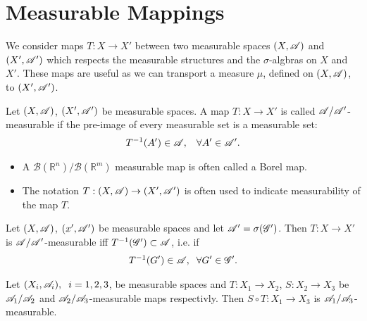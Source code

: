 \section{Measurable Mappings}

    We consider maps $T:X\rightarrow X'$ between two measurable spaces $(X,\mathscr{A})$ and $(X',\mathscr{A}')$ which respects the measurable 
    structures and the $\sigma$-algbras on $X$ and $X'$. These maps are useful as we can transport a measure $\mu$, defined on $(X,\mathscr{A})$, to $(X',\mathscr{A}')$.

    

    \begin{definition}
        Let $(X,\mathscr{A})$, $(X',\mathscr{A}')$ be measurable spaces. A map $T:X\rightarrow X'$ is called $\mathscr{A}/\mathscr{A}'$-measurable if the pre-image of every measurable set is a measurable set: 
        \begin{align}
        T^{-1}(A')\in \mathscr{A},\hspace{3mm} \forall A'\in\mathscr{A}'.    
        \end{align}

    \end{definition}
    \begin{itemize}
        \item A $\mathcal B(\mathbb R^n)/\mathcal B(\mathbb R^m)$ measurable map is often called a Borel map. 
        \item The notation $T:(X,\mathscr{A})\rightarrow (X',\mathscr{A}')$ is often used to indicate measurability of the map $T$.
    \end{itemize}

    \begin{lemma}
        Let $(X,\mathscr{A})$, $(x',\mathscr{A}')$ be measurable spaces and let $\mathscr{A}' = \sigma(\mathscr{G}')$. Then $T:X\rightarrow X'$ is $\mathscr{A}/\mathscr{A}'$-measurable iff $T^{-1}(\mathscr{G}')\subset \mathscr{A}$, i.e. if 
        \begin{align}
            T^{-1}(G')\in\mathscr{A},\hspace{2mm} \forall G'\in\mathscr{G}'.
        \end{align} 
    \end{lemma}


	\begin{theorem}

        Let $(X_i,\mathscr{A}_i),\hspace{2mm}i=1,2,3$, be measurable spaces and $T:X_1\rightarrow X_2$, $S:X_2\rightarrow X_3$ be $\mathscr{A}_1/\mathscr{A}_2$ and $\mathscr{A}_2/\mathscr{A}_3$-measurable maps respectivly. Then $S\circ T:X_1\rightarrow X_3$ is $\mathscr{A}_1/\mathscr{A}_3$-measurable. 

	\end{theorem}

